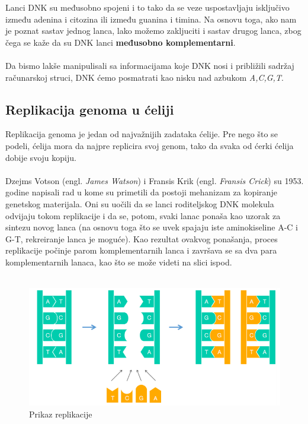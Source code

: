 Lanci DNK su međusobno spojeni i to tako da se veze uspostavljaju isključivo između adenina i citozina ili između guanina i timina. Na osnovu toga, ako nam je poznat sastav jednog lanca, lako možemo zakljuciti i sastav drugog lanca, zbog čega se kaže da su DNK lanci \textbf{međusobno komplementarni}.\\\\
Da bismo lakše manipulisali sa informacijama koje DNK nosi i približili sadržaj računarskoj struci, DNK ćemo posmatrati kao nisku nad azbukom \textit{A,C,G,T}.

\subsection{Replikacija genoma u ćeliji}
Replikacija genoma je jedan od najvažnijih zadataka ćelije. Pre nego što se podeli, ćelija mora da najpre replicira svoj genom, tako da svaka od ćerki ćelija dobije svoju kopiju. \\\\
Dzejms Votson (engl. \textit{James Watson}) i Fransis Krik (engl. \textit{Fransis Crick}) su 1953. godine napisali rad u kome su primetili da postoji mehanizam za kopiranje genetskog materijala. Oni su uočili da se lanci roditeljskog DNK molekula odvijaju tokom replikacije i da se, potom, svaki lanac ponaša kao uzorak za sintezu novog lanca (na osnovu toga što se uvek spajaju iste aminokiseline A-C i G-T, rekreiranje lanca je moguće). Kao rezultat ovakvog ponašanja, proces replikacije počinje parom komplementarnih lanca i završava se sa dva para komplementarnih lanaca, kao što se može videti na slici ispod.\\\\

\begin{figure}[h]
\caption{Prikaz replikacije}
\centering
\includegraphics[width=1\textwidth]{poglavlja/1/slike/Replikacija.png}
\end{figure} 

